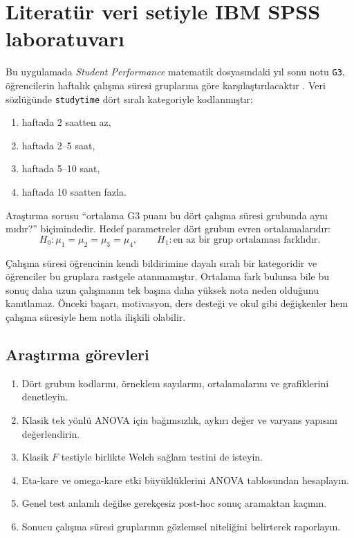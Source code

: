 \section{Literatür veri setiyle IBM SPSS laboratuvarı}

Bu uygulamada \emph{Student Performance} matematik dosyasındaki yıl sonu
notu \texttt{G3}, öğrencilerin haftalık çalışma süresi gruplarına göre
karşılaştırılacaktır \cite{cortez2008data,cortezsilva2008}. Veri sözlüğünde
\texttt{studytime} dört sıralı kategoriyle kodlanmıştır:

\begin{enumerate}
  \item haftada 2 saatten az,
  \item haftada 2--5 saat,
  \item haftada 5--10 saat,
  \item haftada 10 saatten fazla.
\end{enumerate}

Araştırma sorusu ``ortalama G3 puanı bu dört çalışma süresi grubunda aynı
mıdır?'' biçimindedir. Hedef parametreler dört grubun evren ortalamalarıdır:
\[
H_0:\mu_1=\mu_2=\mu_3=\mu_4,
\qquad
H_1:\text{en az bir grup ortalaması farklıdır}.
\]

\begin{researchbox}
Çalışma süresi öğrencinin kendi bildirimine dayalı sıralı bir kategoridir ve
öğrenciler bu gruplara rastgele atanmamıştır. Ortalama fark bulunsa bile bu
sonuç daha uzun çalışmanın tek başına daha yüksek nota neden olduğunu
kanıtlamaz. Önceki başarı, motivasyon, ders desteği ve okul gibi değişkenler
hem çalışma süresiyle hem notla ilişkili olabilir.
\end{researchbox}

\subsection{Araştırma görevleri}

\begin{enumerate}
  \item Dört grubun kodlarını, örneklem sayılarını, ortalamalarını ve grafiklerini denetleyin.
  \item Klasik tek yönlü ANOVA için bağımsızlık, aykırı değer ve varyans yapısını değerlendirin.
  \item Klasik $F$ testiyle birlikte Welch sağlam testini de isteyin.
  \item Eta-kare ve omega-kare etki büyüklüklerini ANOVA tablosundan hesaplayın.
  \item Genel test anlamlı değilse gerekçesiz post-hoc sonuç aramaktan kaçının.
  \item Sonucu çalışma süresi gruplarının gözlemsel niteliğini belirterek raporlayın.
\end{enumerate}

